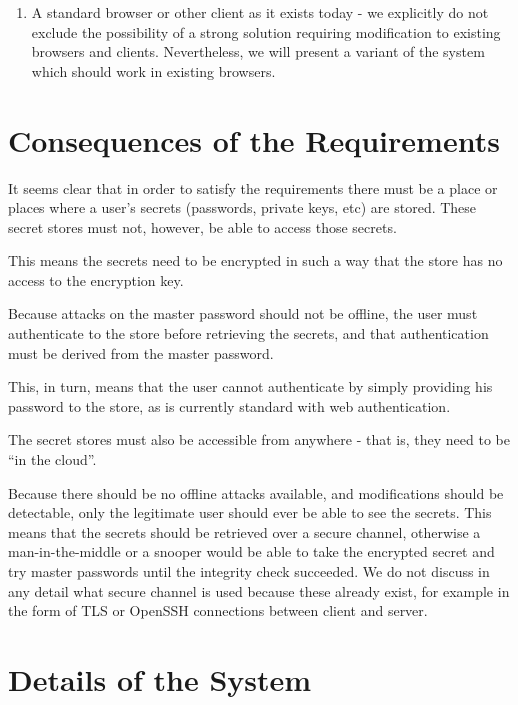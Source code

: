 \documentclass[a4paper,titlepage]{article}
\begin{document}
\begin{enumerate}

  \item A standard browser or other client as it exists today - we
    explicitly do not exclude the possibility of a strong solution
    requiring modification to existing browsers and
    clients. Nevertheless, we will present a variant of the system
    which should work in existing browsers.

\end{enumerate}

\section{Consequences of the Requirements}

It seems clear that in order to satisfy the requirements there must be
a place or places where a user's secrets (passwords, private keys,
etc) are stored. These secret stores must not, however, be able to
access those secrets.

This means the secrets need to be encrypted in such a way that the
store has no access to the encryption key.

Because attacks on the master password should not be offline, the user
must authenticate to the store before retrieving the secrets, and that
authentication must be derived from the master password.

This, in turn, means that the user cannot authenticate by simply
providing his password to the store, as is currently standard with web
authentication.

The secret stores must also be accessible from anywhere - that is,
they need to be ``in the cloud''.

Because there should be no offline attacks available, and
modifications should be detectable, only the legitimate user should
ever be able to see the secrets. This means that the secrets should be
retrieved over a secure channel, otherwise a man-in-the-middle or a
snooper would be able to take the encrypted secret and try master
passwords until the integrity check succeeded. We do not discuss in
any detail what secure channel is used because these already exist,
for example in the form of TLS or OpenSSH connections between client
and server.

\section{Details of the System}
\end{document}
